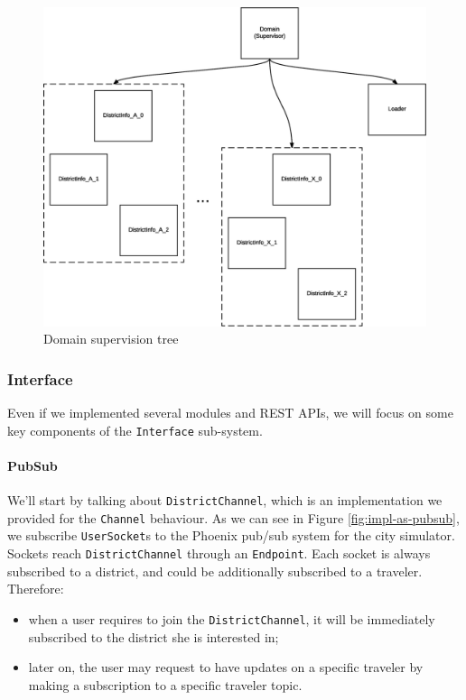 \begin{figure}[H]
  \centering
  \includegraphics[width=\columnwidth]{images/implementation/as-domain.eps}
  \caption{Domain supervision tree}
  \label{fig:impl-as-domain}
\end{figure}

\subsubsection{Interface}

Even if we implemented several modules and REST APIs, we will focus on some
key components of the \texttt{Interface} sub-system.

\paragraph{PubSub}
We'll start by talking about \texttt{DistrictChannel}, which is an
implementation we provided for the \texttt{Channel} behaviour. As we can see
in Figure \ref{fig:impl-as-pubsub}, we subscribe \texttt{UserSocket}s to the
Phoenix pub/sub system for the city simulator.
Sockets reach \texttt{DistrictChannel} through an \texttt{Endpoint}.
Each socket is always subscribed to a district, and could be additionally
subscribed to a traveler. Therefore:

\begin{itemize}
  \item when a user requires to join the \texttt{DistrictChannel}, it will
    be immediately subscribed to the district she is interested in;
  \item later on, the user may request to have updates on a specific traveler
    by making a subscription to a specific traveler topic.
\end{itemize}

